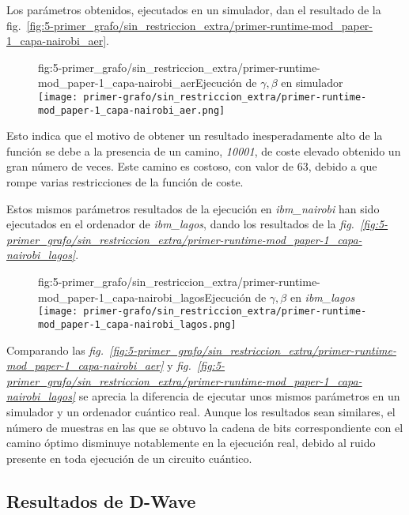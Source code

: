 Los parámetros obtenidos, ejecutados en un simulador, dan el resultado de la fig.~\ref{fig:5-primer_grafo/sin_restriccion_extra/primer-runtime-mod_paper-1_capa-nairobi_aer}.

\begin{figure}[Resultados QAOA {--} artículo de Urgelles et al. {--} ejecución en simulador]{fig:5-primer_grafo/sin_restriccion_extra/primer-runtime-mod_paper-1_capa-nairobi_aer}{Ejecución de $\gamma, \beta$ en simulador}
  \centering
  \texttt{[image: primer-grafo/sin\_restriccion\_extra/primer-runtime-mod\_paper-1\_capa-nairobi\_aer.png]}
\end{figure}

Esto indica que el motivo de obtener un resultado inesperadamente alto de la función se debe a la presencia de un camino, \textit{10001}, de coste elevado obtenido un gran número de veces. Este camino es costoso, con valor de 63, debido a que rompe varias restricciones de la función de coste.

Estos mismos parámetros resultados de la ejecución en \textit{ibm\_nairobi} han sido ejecutados en el ordenador de \textit{ibm\_lagos}, dando los resultados de la \textit{fig.~\ref{fig:5-primer_grafo/sin_restriccion_extra/primer-runtime-mod_paper-1_capa-nairobi_lagos}}.

\begin{figure}[Resultados QAOA {--} artículo de Urgelles et al. {--} ejecución en ordenador real]{fig:5-primer_grafo/sin_restriccion_extra/primer-runtime-mod_paper-1_capa-nairobi_lagos}{Ejecución de $\gamma, \beta$ en \textit{ibm\_lagos}}
  \centering
  \texttt{[image: primer-grafo/sin\_restriccion\_extra/primer-runtime-mod\_paper-1\_capa-nairobi\_lagos.png]}
\end{figure}

Comparando las \textit{fig.~\ref{fig:5-primer_grafo/sin_restriccion_extra/primer-runtime-mod_paper-1_capa-nairobi_aer}} y \textit{fig.~\ref{fig:5-primer_grafo/sin_restriccion_extra/primer-runtime-mod_paper-1_capa-nairobi_lagos}}
se aprecia la diferencia de ejecutar unos mismos parámetros en un simulador y un ordenador cuántico real.
Aunque los resultados sean similares, el número de muestras en las que se obtuvo la cadena de bits correspondiente con el camino óptimo disminuye notablemente en la ejecución real, debido al ruido presente en toda ejecución de un circuito cuántico.


\subsection{Resultados de D-Wave}

